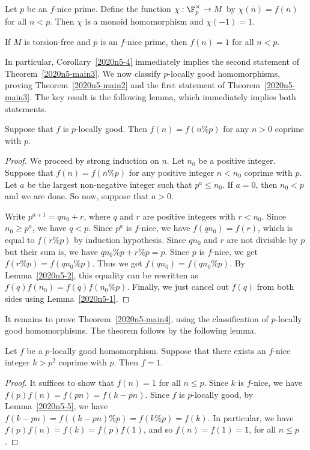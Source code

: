 \begin{corollary}\label{2020n5-3}
Let $p$ be an $f$-nice prime.
Define the function $\chi : \F_p^{\times} \to M$ by $\chi(\overline{n}) = f(n)$ for all $n < p$.
Then $\chi$ is a monoid homomorphism and $\chi(-1) = 1$.
\end{corollary}

\begin{corollary}\label{2020n5-4}
If $M$ is torsion-free and $p$ is an $f$-nice prime, then $f(n) = 1$ for all $n < p$.
\end{corollary}

In particular, Corollary~\ref{2020n5-4} immediately implies the second statement of Theorem~\ref{2020n5-main3}.
We now classify $p$-locally good homomorphisms, proving Theorem~\ref{2020n5-main2} and the first statement of Theorem~\ref{2020n5-main3}.
The key result is the following lemma, which immediately implies both statements.

\begin{lemma}\label{2020n5-5}
Suppose that $f$ is $p$-locally good.
Then $f(n) = f(n \% p)$ for any $n > 0$ coprime with $p$.
\end{lemma}
\begin{proof}
We proceed by strong induction on $n$.
Let $n_0$ be a positive integer.
Suppose that $f(n) = f(n \% p)$ for any positive integer $n < n_0$ coprime with $p$.
Let $a$ be the largest non-negative integer such that $p^a \leq n_0$.
If $a = 0$, then $n_0 < p$ and we are done.
So now, suppose that $a > 0$.

Write $p^{a + 1} = qn_0 + r$, where $q$ and $r$ are positive integers with $r < n_0$.
Since $n_0 \geq p^a$, we have $q < p$.
Since $p^a$ is $f$-nice, we have $f(qn_0) = f(r)$, which is equal to $f(r \% p)$ by induction hypothesis.
Since $qn_0$ and $r$ are not divisible by $p$ but their sum is, we have $qn_0 \% p + r \% p = p$.
Since $p$ is $f$-nice, we get $f(r \% p) = f(qn_0 \% p)$.
Thus we get $f(qn_0) = f(qn_0 \% p)$.
By Lemma~\ref{2020n5-2}, this equality can be rewritten as $f(q) f(n_0) = f(q) f(n_0 \% p)$.
Finally, we just cancel out $f(q)$ from both sides using Lemma~\ref{2020n5-1}.
\end{proof}

It remains to prove Theorem~\ref{2020n5-main4}, using the classification of $p$-locally good homomorphisms.
The theorem follows by the following lemma.

\begin{lemma}\label{2020n5-6}
Let $f$ be a $p$-locally good homomorphism.
Suppose that there exists an $f$-nice integer $k > p^2$ coprime with $p$.
Then $f = 1$.
\end{lemma}
\begin{proof}
It suffices to show that $f(n) = 1$ for all $n \leq p$.
Since $k$ is $f$-nice, we have $f(p) f(n) = f(pn) = f(k - pn)$.
Since $f$ is $p$-locally good, by Lemma~\ref{2020n5-5}, we have $f(k - pn) = f((k - pn) \% p) = f(k \% p) = f(k)$.
In particular, we have $f(p) f(n) = f(k) = f(p) f(1)$, and so $f(n) = f(1) = 1$, for all $n \leq p$.
\end{proof}




